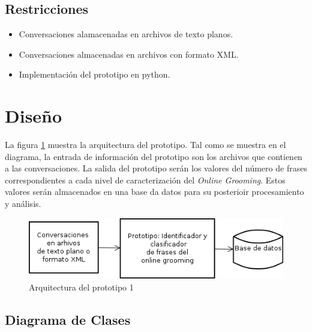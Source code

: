 \subsection{Restricciones}
\begin{itemize}
\item Conversaciones alamacenadas en archivos de texto planos.
\item Conversaciones almacenadas en archivos con formato XML.
\item Implementaci\'on del prototipo en python.

\end{itemize}

\section{Dise\~no}

La figura \ref{fig:arquitectura_prototipo1} muestra la arquitectura del prototipo. Tal como se muestra en el diagrama, la entrada de informaci\'on del prototipo son los archivos que contienen a las conversaciones. La salida del prototipo ser\'an los valores del n\'umero de frases correspondientes a cada nivel de caracterizaci\'on del \textit{Online Grooming}. Estos valores ser\'an almacenados en una base da datos para su posterioir procesamiento y análisis.



	\begin{figure}[!h]
	\begin{center}
	\includegraphics[scale=.5]{images/arquitectura_prototipo1}
	\caption{Arquitectura del prototipo 1}
	\label{fig:arquitectura_prototipo1}
	\end{center}
	\end{figure}


\subsection{Diagrama de Clases}


